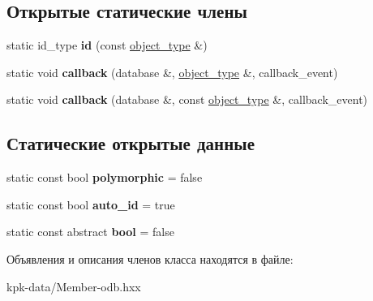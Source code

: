 \subsection*{Открытые статические члены}
\begin{DoxyCompactItemize}
\item 
static id\+\_\+type {\bfseries id} (const \hyperlink{classkpk_1_1data_1_1_member}{object\+\_\+type} \&)\hypertarget{classodb_1_1access_1_1object__traits_3_01_1_1kpk_1_1data_1_1_member_01_4_a0e6004dfa19f43eed32911af723d5b27}{}\label{classodb_1_1access_1_1object__traits_3_01_1_1kpk_1_1data_1_1_member_01_4_a0e6004dfa19f43eed32911af723d5b27}

\item 
static void {\bfseries callback} (database \&, \hyperlink{classkpk_1_1data_1_1_member}{object\+\_\+type} \&, callback\+\_\+event)\hypertarget{classodb_1_1access_1_1object__traits_3_01_1_1kpk_1_1data_1_1_member_01_4_a157b0f727562dd55b6eb76973a8b6611}{}\label{classodb_1_1access_1_1object__traits_3_01_1_1kpk_1_1data_1_1_member_01_4_a157b0f727562dd55b6eb76973a8b6611}

\item 
static void {\bfseries callback} (database \&, const \hyperlink{classkpk_1_1data_1_1_member}{object\+\_\+type} \&, callback\+\_\+event)\hypertarget{classodb_1_1access_1_1object__traits_3_01_1_1kpk_1_1data_1_1_member_01_4_a205f771be42cb0b03562790c8d17c231}{}\label{classodb_1_1access_1_1object__traits_3_01_1_1kpk_1_1data_1_1_member_01_4_a205f771be42cb0b03562790c8d17c231}

\end{DoxyCompactItemize}
\subsection*{Статические открытые данные}
\begin{DoxyCompactItemize}
\item 
static const bool {\bfseries polymorphic} = false\hypertarget{classodb_1_1access_1_1object__traits_3_01_1_1kpk_1_1data_1_1_member_01_4_a2e64fbdb2d154e883e553144abd9f936}{}\label{classodb_1_1access_1_1object__traits_3_01_1_1kpk_1_1data_1_1_member_01_4_a2e64fbdb2d154e883e553144abd9f936}

\item 
static const bool {\bfseries auto\+\_\+id} = true\hypertarget{classodb_1_1access_1_1object__traits_3_01_1_1kpk_1_1data_1_1_member_01_4_a13d31c11d507f57a6e0d9af0dfe0d52f}{}\label{classodb_1_1access_1_1object__traits_3_01_1_1kpk_1_1data_1_1_member_01_4_a13d31c11d507f57a6e0d9af0dfe0d52f}

\item 
static const abstract {\bfseries bool} = false\hypertarget{classodb_1_1access_1_1object__traits_3_01_1_1kpk_1_1data_1_1_member_01_4_af7cc65909700c4b89aea91d0890b6d53}{}\label{classodb_1_1access_1_1object__traits_3_01_1_1kpk_1_1data_1_1_member_01_4_af7cc65909700c4b89aea91d0890b6d53}

\end{DoxyCompactItemize}


Объявления и описания членов класса находятся в файле\+:\begin{DoxyCompactItemize}
\item 
kpk-\/data/Member-\/odb.\+hxx\end{DoxyCompactItemize}
